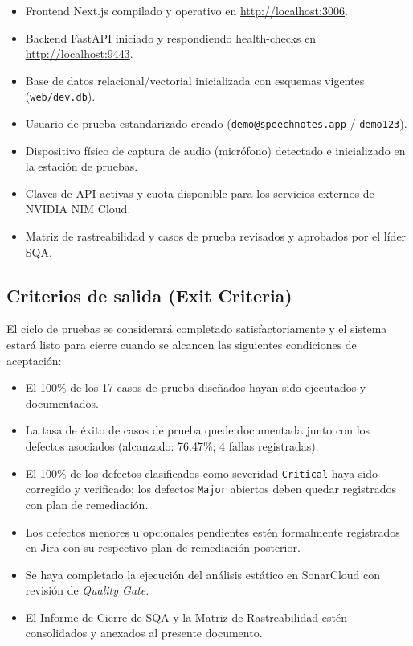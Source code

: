 \begin{itemize}
    \item Frontend Next.js compilado y operativo en \url{http://localhost:3006}.
    \item Backend FastAPI iniciado y respondiendo health-checks en \url{http://localhost:9443}.
    \item Base de datos relacional/vectorial inicializada con esquemas vigentes (\texttt{web/dev.db}).
    \item Usuario de prueba estandarizado creado (\texttt{demo@speechnotes.app} / \texttt{demo123}).
    \item Dispositivo físico de captura de audio (micrófono) detectado e inicializado en la estación de pruebas.
    \item Claves de API activas y cuota disponible para los servicios externos de NVIDIA NIM Cloud.
    \item Matriz de rastreabilidad y casos de prueba revisados y aprobados por el líder SQA.
\end{itemize}

\subsection{Criterios de salida (Exit Criteria)}
\label{subsec:exit}

El ciclo de pruebas se considerará completado satisfactoriamente y el sistema estará listo para cierre cuando se alcancen las siguientes condiciones de aceptación:

\begin{itemize}
    \item El 100\% de los 17 casos de prueba diseñados hayan sido ejecutados y documentados.
    \item La tasa de éxito de casos de prueba quede documentada junto con los defectos asociados (alcanzado: 76.47\%; 4 fallas registradas).
    \item El 100\% de los defectos clasificados como severidad \texttt{Critical} haya sido corregido y verificado; los defectos \texttt{Major} abiertos deben quedar registrados con plan de remediación.
    \item Los defectos menores u opcionales pendientes estén formalmente registrados en Jira con su respectivo plan de remediación posterior.
    \item Se haya completado la ejecución del análisis estático en SonarCloud con revisión de \textit{Quality Gate}.
    \item El Informe de Cierre de SQA y la Matriz de Rastreabilidad estén consolidados y anexados al presente documento.
\end{itemize}

